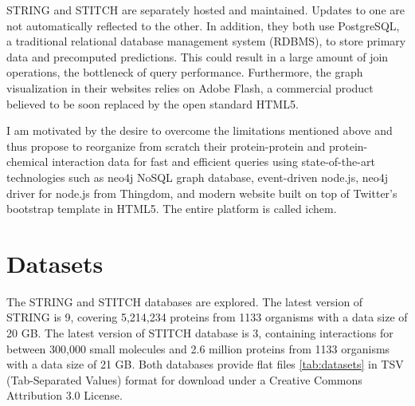 \documentclass[10pt,conference,compsocconf]{../IEEEtran}
\begin{document}
STRING and STITCH are separately hosted and maintained. Updates to one are not automatically reflected to the other. In addition, they both use PostgreSQL, a traditional relational database management system (RDBMS), to store primary data and precomputed predictions. This could result in a large amount of join operations, the bottleneck of query performance. Furthermore, the graph visualization in their websites relies on Adobe Flash, a commercial product believed to be soon replaced by the open standard HTML5.

I am motivated by the desire to overcome the limitations mentioned above and thus propose to reorganize from scratch their protein-protein and protein-chemical interaction data for fast and efficient queries using state-of-the-art technologies such as neo4j NoSQL graph database, event-driven node.js, neo4j driver for node.js from Thingdom, and modern website built on top of Twitter's bootstrap template in HTML5. The entire platform is called ichem.

\section{Datasets}

The STRING and STITCH databases are explored. The latest version of STRING is 9, covering 5,214,234 proteins from 1133 organisms with a data size of 20 GB. The latest version of STITCH database is 3, containing interactions for between 300,000 small molecules and 2.6 million proteins from 1133 organisms with a data size of 21 GB. Both databases provide flat files \ref{tab:datasets} in TSV (Tab-Separated Values) format for download under a Creative Commons Attribution 3.0 License.
\end{document}
